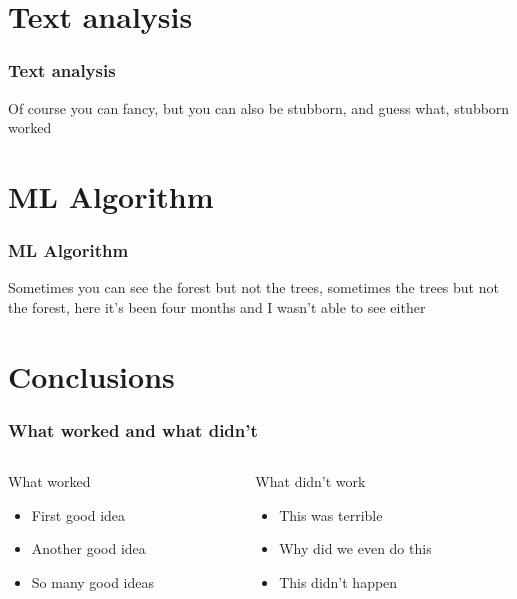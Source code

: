 \documentclass{beamer}
\begin{document}

\section{Text analysis}
\begin{frame}
\frametitle{Text analysis}
Of course you can fancy, but you can also be stubborn, and guess what, stubborn worked
\end{frame}


\section{ML Algorithm}
\begin{frame}
\frametitle{ML Algorithm}
Sometimes you can see the forest but not the trees, sometimes the trees but not the forest, here it's been four months and I wasn't able to see either
\end{frame}


\section{Conclusions}
\begin{frame}
\frametitle{What worked and what didn't}
\begin{columns}
	\begin{column}{0.5\textwidth}
 	  	\begin{exampleblock}{\begin{center}What worked\end{center}}
			\justifying
			\begin{itemize}
  				\item First good idea
 				\item Another good idea
  				\item So many good ideas
  			\end{itemize}
		\end{exampleblock}
	\end{column}
	\begin{column}{0.5\textwidth}  
		\begin{alertblock}{\begin{center}What didn't work\end{center}}
			\begin{itemize}
  				\item This was terrible
 				\item Why did we even do this
  				\item This didn't happen
  			\end{itemize}
		\end{alertblock}
	\end{column}
\end{columns}
\end{frame}

\end{document}
